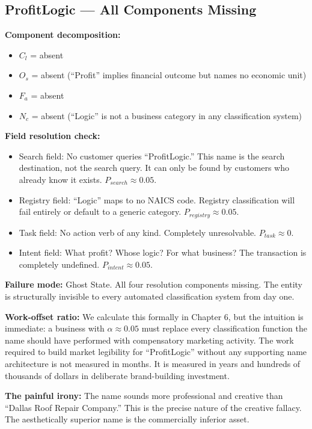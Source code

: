 \documentclass[12pt, openany]{book}
\theoremstyle{thmstyle}
\theoremstyle{defstyle}
\newcommand{\Nc}{N_c}
\newcommand{\Os}{O_s}
\newcommand{\Fa}{F_a}
\newcommand{\Cl}{C_l}
\begin{document}
\subsection{ProfitLogic --- All Components Missing}

\begin{examplebox}
\textbf{Component decomposition:}
\begin{itemize}[leftmargin=1.5em]
  \item $\Cl$ = absent
  \item $\Os$ = absent (``Profit'' implies financial outcome but names no economic unit)
  \item $\Fa$ = absent
  \item $\Nc$ = absent (``Logic'' is not a business category in any classification system)
\end{itemize}

\textbf{Field resolution check:}
\begin{itemize}[leftmargin=1.5em]
  \item Search field: No customer queries ``ProfitLogic.'' This name is the search destination, not the search query. It can only be found by customers who already know it exists. $P_{search} \approx 0.05$.
  \item Registry field: ``Logic'' maps to no NAICS code. Registry classification will fail entirely or default to a generic category. $P_{registry} \approx 0.05$.
  \item Task field: No action verb of any kind. Completely unresolvable. $P_{task} \approx 0$.
  \item Intent field: What profit? Whose logic? For what business? The transaction is completely undefined. $P_{intent} \approx 0.05$.
\end{itemize}

\textbf{Failure mode:} Ghost State. All four resolution components missing. The entity is structurally invisible to every automated classification system from day one.

\textbf{Work-offset ratio:} We calculate this formally in Chapter 6, but the intuition is immediate: a business with $\alpha \approx 0.05$ must replace every classification function the name should have performed with compensatory marketing activity. The work required to build market legibility for ``ProfitLogic'' without any supporting name architecture is not measured in months. It is measured in years and hundreds of thousands of dollars in deliberate brand-building investment.

\textbf{The painful irony:} The name sounds more professional and creative than ``Dallas Roof Repair Company.'' This is the precise nature of the creative fallacy. The aesthetically superior name is the commercially inferior asset.
\end{examplebox}
\end{document}
